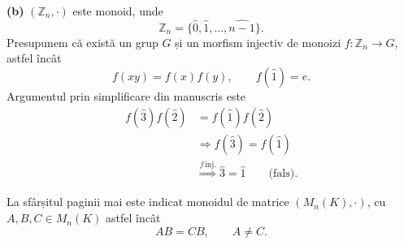 \medskip
\noindent\textbf{(b)} $(\mathbb Z_n,\cdot)$ este monoid, unde
\[
  \mathbb Z_n=\{\widehat{0},\widehat{1},\ldots,
       \widehat{n-1}\}.
\]
Presupunem că există un grup $G$ și un morfism injectiv de monoizi
$f:\mathbb Z_n\to G$, astfel încât
\[
  f(xy)=f(x)f(y),\qquad f(\widehat{1})=e.
\]
Argumentul prin simplificare din manuscris este
\[
\begin{aligned}
  f(\widehat{3})f(\widehat{2})
    &=f(\widehat{1})f(\widehat{2})\\
  &\Longrightarrow f(\widehat{3})=f(\widehat{1})\\
  &\overset{f\,\mathrm{inj.}}{\Longrightarrow}
      \widehat{3}=\widehat{1}\qquad\text{(fals).}
\end{aligned}
\]

\noindent La sfârșitul paginii mai este indicat monoidul de matrice
$(M_n(K),\cdot)$, cu $A,B,C\in M_n(K)$ astfel încât
\[
  AB=CB,\qquad A\neq C.
\]
